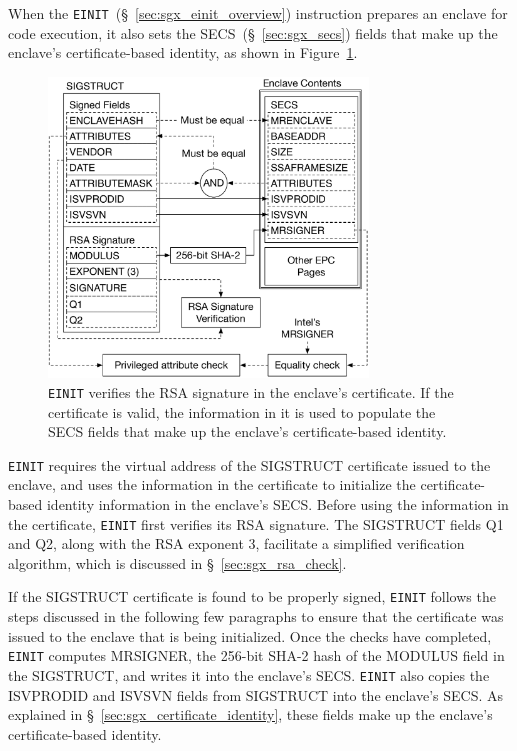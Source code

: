 When the \texttt{EINIT}~(\S~\ref{sec:sgx_einit_overview}) instruction prepares
an enclave for code execution, it also sets the SECS~(\S~\ref{sec:sgx_secs})
fields that make up the enclave's certificate-based identity, as shown in
Figure~\ref{fig:sgx_einit_sigstruct}.

\begin{figure}[hbt]
  \centering
  \includegraphics[width=85mm]{figures/sgx_einit_sigstruct.pdf}
  \caption{
    \texttt{EINIT} verifies the RSA signature in the enclave's certificate. If
    the certificate is valid, the information in it is used to populate the
    SECS fields that make up the enclave's certificate-based identity.
  }
  \label{fig:sgx_einit_sigstruct}
\end{figure}


\texttt{EINIT} requires the virtual address of the SIGSTRUCT certificate
issued to the enclave, and uses the information in the certificate to
initialize the certificate-based identity information in the enclave's SECS.
Before using the information in the certificate, \texttt{EINIT} first verifies
its RSA signature. The SIGSTRUCT fields Q1 and Q2, along with the RSA exponent
3, facilitate a simplified verification algorithm, which is discussed in
\S~\ref{sec:sgx_rsa_check}.

If the SIGSTRUCT certificate is found to be properly signed, \texttt{EINIT}
follows the steps discussed in the following few paragraphs to ensure that the
certificate was issued to the enclave that is being initialized. Once the
checks have completed, \texttt{EINIT} computes MRSIGNER, the 256-bit SHA-2 hash
of the MODULUS field in the SIGSTRUCT, and writes it into the enclave's SECS.
\texttt{EINIT} also copies the ISVPRODID and ISVSVN fields from SIGSTRUCT into
the enclave's SECS. As explained in \S~\ref{sec:sgx_certificate_identity},
these fields make up the enclave's certificate-based identity.

